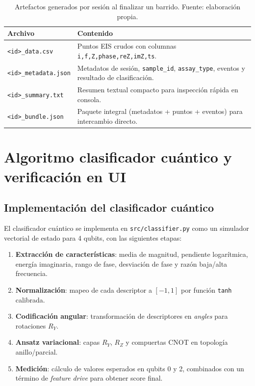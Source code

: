 \documentclass[11pt,a4paper,spanish]{book}
\begin{document}
\begin{table}[ht]
	\centering
	\begin{tabular}{l p{8.8cm}}
		\hline\hline
		Archivo                      & Contenido                                                                 \\ [0.5ex]
		\hline
		\texttt{<id>\_data.csv}      & Puntos EIS crudos con columnas \texttt{i,f,Z,phase,reZ,imZ,ts}.           \\
		\texttt{<id>\_metadata.json} & Metadatos de sesi\'{o}n, \texttt{sample\_id}, \texttt{assay\_type}, eventos y resultado de clasificaci\'{o}n.        \\
		\texttt{<id>\_summary.txt}   & Resumen textual compacto para inspecci\'{o}n r\'{a}pida en consola.       \\
		\texttt{<id>\_bundle.json}   & Paquete integral (metadatos + puntos + eventos) para intercambio directo. \\
		\hline
	\end{tabular}
	\caption[Artefactos de exportaci\'{o}n]{Artefactos generados por sesi\'{o}n al finalizar un barrido. Fuente: elaboraci\'{o}n propia.}
	\label{tab:artefactos-fase4}
\end{table}


\chapter{Algoritmo clasificador cu\'{a}ntico y verificaci\'{o}n en UI}

\section{Implementaci\'{o}n del clasificador cu\'{a}ntico}

El clasificador cu\'{a}ntico se implementa en \texttt{src/classifier.py} como un simulador vectorial de estado para 4 qubits, con las siguientes etapas:

\begin{enumerate}
	\item \textbf{Extracci\'{o}n de caracter\'{i}sticas}: media de magnitud, pendiente logar\'{i}tmica, energ\'{i}a imaginaria, rango de fase, desviaci\'{o}n de fase y raz\'{o}n baja/alta frecuencia.
	\item \textbf{Normalizaci\'{o}n}: mapeo de cada descriptor a $[-1,1]$ por funci\'{o}n \texttt{tanh} calibrada.
	\item \textbf{Codificaci\'{o}n angular}: transformaci\'{o}n de descriptores en \textit{angles} para rotaciones $R_Y$.
	\item \textbf{Ansatz variacional}: capas $R_Y$, $R_Z$ y compuertas CNOT en topolog\'{i}a anillo/parcial.
	\item \textbf{Medici\'{o}n}: c\'{a}lculo de valores esperados en qubits 0 y 2, combinados con un t\'{e}rmino de \textit{feature drive} para obtener score final.
\end{enumerate}
\end{document}
